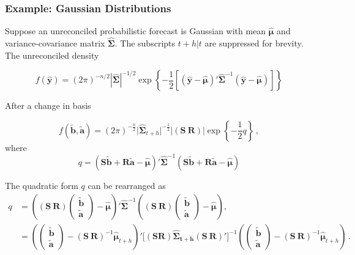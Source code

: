 \documentclass[a4paper, 11pt]{article}
\def\bt{\begin{pmatrix}\tilde{\bm{b}}\\[-0.2cm]\tilde{\bm{a}}\end{pmatrix}}
\theoremstyle{theo}
\theoremstyle{definition}
\begin{document}
\subsubsection*{Example: Gaussian Distributions}

Suppose an unreconciled probabilistic forecast is Gaussian with mean $\hat{\bm \mu}$ and variance-covariance matrix $\hat{\bm \Sigma}$.  The subscripts $t+h|t$ are suppressed for brevity.  The unreconciled density

\begin{equation}
  f(\hat{\bm{y}})=(2\pi)^{-n/2}|\hat{\bm{\Sigma}}|^{-1/2}\exp\left\{-\frac{1}{2}\left[(\hat{\bm y}-\hat{\bm \mu})'\hat{\bm{\Sigma}}^{-1}(\hat{\bm y}-\hat{\bm \mu})\right]\right\}
\end{equation}

After a change in basis

\begin{equation}
f(\tilde{\bm b},\tilde{\bm a})=(2\pi)^{-\frac{n}{2}}\Big|\bm{\hat{\Sigma}}_{t+h}\Big|^{-\frac{1}{2}}\Big|(\bm{S} ~  \bm{R})\Big|\exp\left\{-\frac{1}{2}q\right\}\,,
\end{equation}
where
\begin{equation}
q=(\bm{S}\tilde{\bm{b}}+\bm{R}\tilde{\bm{a}}-\bm{\hat{\mu}})' \bm{\hat{\Sigma}}^{-1}(\bm{S}\tilde{\bm{b}}+\bm{R}\tilde{\bm{a}}-\bm{\hat{\mu}})
\end{equation}


The quadratic form $q$ can be rearranged as
\begin{align*}
q& = 
\left((\bm{S} ~  \bm{R})\bt-\bm{\hat{\mu}}\right)' \bm{\hat{\Sigma}}^{-1}\left((\bm{S} ~ \bm{R})\bt-\bm{\hat{\mu}}\right),\\
& =
\left(\bt-(\bm{S} ~ \bm{R})^{-1}\bm{\hat{\mu}}_{t+h}\right)' \Big[(\bm{S}  \bm{R})\bm{\hat{\Sigma}_{t+h}}(\bm{S} ~ \bm{R})'\Big]^{-1}
\left(\bt-(\bm{S} ~ \bm{R})^{-1}\bm{\hat{\mu}}_{t+h}\right)\,.
\end{align*}
\end{document}
